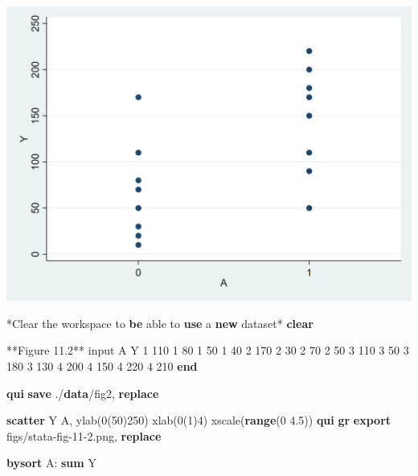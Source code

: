 \documentclass[
  10pt,
]{book}
\newenvironment{Shaded}{\begin{snugshade}}{\end{snugshade}}
\newcommand{\BaseNTok}[1]{\textcolor[rgb]{0.00,0.00,0.81}{#1}}
\newcommand{\KeywordTok}[1]{\textcolor[rgb]{0.13,0.29,0.53}{\textbf{#1}}}
\newcommand{\NormalTok}[1]{#1}
\begin{document}
\begin{center}\includegraphics[width=0.85\linewidth]{figs/stata-fig-11-1} \end{center}

\begin{Shaded}
\begin{Highlighting}[]
\NormalTok{*Clear the workspace to }\KeywordTok{be}\NormalTok{ able to }\KeywordTok{use}\NormalTok{ a }\KeywordTok{new}\NormalTok{ dataset*}
\KeywordTok{clear}

\NormalTok{**Figure 11.2**}
\NormalTok{input A Y}
\NormalTok{1 110}
\NormalTok{1 80}
\NormalTok{1 50}
\NormalTok{1 40}
\NormalTok{2 170}
\NormalTok{2 30}
\NormalTok{2 70}
\NormalTok{2 50}
\NormalTok{3 110}
\NormalTok{3 50}
\NormalTok{3 180}
\NormalTok{3 130}
\NormalTok{4 200}
\NormalTok{4 150}
\NormalTok{4 220}
\NormalTok{4 210}
\KeywordTok{end}

\KeywordTok{qui} \KeywordTok{save}\NormalTok{ ./}\KeywordTok{data}\NormalTok{/fig2, }\KeywordTok{replace}

\KeywordTok{scatter}\NormalTok{ Y A, ylab(0(50)250) xlab(0(1)4) }\BaseNTok{xscale}\NormalTok{(}\KeywordTok{range}\NormalTok{(0 4.5))}
\KeywordTok{qui} \KeywordTok{gr} \KeywordTok{export}\NormalTok{ figs/stata-fig-11-2.png, }\KeywordTok{replace}

\KeywordTok{bysort}\NormalTok{ A: }\KeywordTok{sum}\NormalTok{ Y}
\end{Highlighting}
\end{Shaded}
\end{document}
